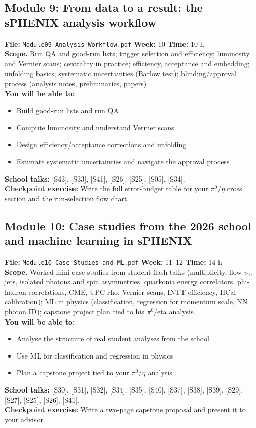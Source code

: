 \documentclass[11pt,letterpaper]{article}
\begin{document}
\subsection*{Module 9: From data to a result: the sPHENIX analysis workflow}
\textbf{File:} \texttt{Module09\_Analysis\_Workflow.pdf} \quad \textbf{Week:} 10 \quad \textbf{Time:} 10 h\\
\textbf{Scope.} Run QA and good-run lists; trigger selection and efficiency; luminosity and Vernier scans; centrality in practice; efficiency, acceptance and embedding; unfolding basics; systematic uncertainties (Barlow test); blinding/approval process (analysis notes, preliminaries, papers).\\
\textbf{You will be able to:}
\begin{itemize}
\item Build good-run lists and run QA
\item Compute luminosity and understand Vernier scans
\item Design efficiency/acceptance corrections and unfolding
\item Estimate systematic uncertainties and navigate the approval process
\end{itemize}
\textbf{School talks:} [S43], [S33], [S41], [S26], [S25], [S05], [S34].\\
\textbf{Checkpoint exercise:} Write the full error-budget table for your $\pi^0$/$\eta$ cross section and the run-selection flow chart.
\medskip
\subsection*{Module 10: Case studies from the 2026 school and machine learning in sPHENIX}
\textbf{File:} \texttt{Module10\_Case\_Studies\_and\_ML.pdf} \quad \textbf{Week:} 11--12 \quad \textbf{Time:} 14 h\\
\textbf{Scope.} Worked mini-case-studies from student flash talks (multiplicity, flow $v_2$, jets, isolated photons and spin asymmetries, quarkonia energy correlators, phi-hadron correlations, CME, UPC rho, Vernier scans, INTT efficiency, HCal calibration); ML in physics (classification, regression for momentum scale, NN photon ID); capstone project plan tied to his $\pi^0$/eta analysis.\\
\textbf{You will be able to:}
\begin{itemize}
\item Analyse the structure of real student analyses from the school
\item Use ML for classification and regression in physics
\item Plan a capstone project tied to your $\pi^0$/$\eta$ analysis
\end{itemize}
\textbf{School talks:} [S30], [S31], [S32], [S34], [S35], [S40], [S37], [S38], [S39], [S29], [S27], [S25], [S26], [S41].\\
\textbf{Checkpoint exercise:} Write a two-page capstone proposal and present it to your advisor.
\medskip
\end{document}
